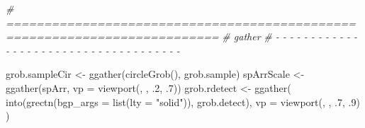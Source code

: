 \documentclass[
]{article}
\newenvironment{Shaded}{\begin{snugshade}}{\end{snugshade}}
\newcommand{\AttributeTok}[1]{\textcolor[rgb]{0.77,0.63,0.00}{#1}}
\newcommand{\CommentTok}[1]{\textcolor[rgb]{0.56,0.35,0.01}{\textit{#1}}}
\newcommand{\DecValTok}[1]{\textcolor[rgb]{0.00,0.00,0.81}{#1}}
\newcommand{\FunctionTok}[1]{\textcolor[rgb]{0.00,0.00,0.00}{#1}}
\newcommand{\NormalTok}[1]{#1}
\newcommand{\OtherTok}[1]{\textcolor[rgb]{0.56,0.35,0.01}{#1}}
\newcommand{\StringTok}[1]{\textcolor[rgb]{0.31,0.60,0.02}{#1}}
\begin{document}
\begin{Shaded}
\begin{Highlighting}[]
\CommentTok{\# ==========================================================================}
\CommentTok{\# gather}
\CommentTok{\# {-} {-} {-} {-} {-} {-} {-} {-} {-} {-} {-} {-} {-} {-} {-} {-} {-} {-} {-} {-} {-} {-} {-} {-} {-} {-} {-} {-} {-} {-} {-} {-} {-} {-} {-} {-} {-}}

\NormalTok{grob.sampleCir }\OtherTok{\textless{}{-}} \FunctionTok{ggather}\NormalTok{(}\FunctionTok{circleGrob}\NormalTok{(), grob.sample)}
\NormalTok{spArrScale }\OtherTok{\textless{}{-}} \FunctionTok{ggather}\NormalTok{(spArr, }\AttributeTok{vp =} \FunctionTok{viewport}\NormalTok{(, , .}\DecValTok{2}\NormalTok{, .}\DecValTok{7}\NormalTok{))}
\NormalTok{grob.rdetect }\OtherTok{\textless{}{-}} \FunctionTok{ggather}\NormalTok{(}
  \FunctionTok{into}\NormalTok{(}\FunctionTok{grectn}\NormalTok{(}\AttributeTok{bgp\_args =} \FunctionTok{list}\NormalTok{(}\AttributeTok{lty =} \StringTok{"solid"}\NormalTok{)), grob.detect),}
  \AttributeTok{vp =} \FunctionTok{viewport}\NormalTok{(, , .}\DecValTok{7}\NormalTok{, .}\DecValTok{9}\NormalTok{)}
\NormalTok{)}


\end{Highlighting}
\end{Shaded}
\end{document}
